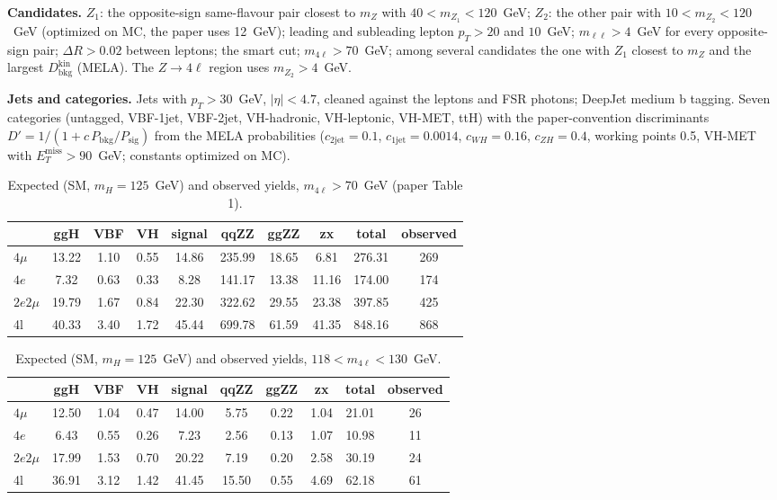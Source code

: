 \documentclass[11pt,a4paper]{article}
\begin{document}
\textbf{Candidates.} $Z_1$: the opposite-sign same-flavour pair closest to $m_Z$ with $40<m_{Z_1}<120$~GeV; $Z_2$:
the other pair with $10<m_{Z_2}<120$~GeV (optimized on MC, the paper uses 12~GeV); leading and subleading lepton
$p_T>20$ and $10$~GeV; $m_{\ell\ell}>4$~GeV for every opposite-sign pair; $\Delta R>0.02$ between leptons; the smart
cut; $m_{4\ell}>70$~GeV; among several candidates the one with $Z_1$ closest to $m_Z$ and the largest
$D_{\text{bkg}}^{\text{kin}}$ (MELA).  The $Z\to4\ell$ region uses $m_{Z_2}>4$~GeV.

\textbf{Jets and categories.} Jets with $p_T>30$~GeV, $|\eta|<4.7$, cleaned against the leptons and FSR photons;
DeepJet medium b tagging.  Seven categories (untagged, VBF-1jet, VBF-2jet, VH-hadronic, VH-leptonic, VH-MET, ttH) with
the paper-convention discriminants $D'=1/(1+c\,P_{\text{bkg}}/P_{\text{sig}})$ from the MELA probabilities
($c_{2\text{jet}}=0.1$, $c_{1\text{jet}}=0.0014$, $c_{WH}=0.16$, $c_{ZH}=0.4$, working points 0.5, VH-MET with
$E_T^{\text{miss}}>90$~GeV; constants optimized on MC).
\begin{table}[H]\centering\small\caption{Expected (SM, $m_H=125$~GeV) and observed yields, $m_{4\ell}>70$~GeV (paper Table 1).}\begin{tabular}{lccccccccc}\toprule & ggH & VBF & VH & signal & qqZZ & ggZZ & zx & total & observed\\\midrule
$4\mu$ & 13.22 & 1.10 & 0.55 & 14.86 & 235.99 & 18.65 & 6.81 & 276.31 & 269\\
$4e$ & 7.32 & 0.63 & 0.33 & 8.28 & 141.17 & 13.38 & 11.16 & 174.00 & 174\\
$2e2\mu$ & 19.79 & 1.67 & 0.84 & 22.30 & 322.62 & 29.55 & 23.38 & 397.85 & 425\\
4l & 40.33 & 3.40 & 1.72 & 45.44 & 699.78 & 61.59 & 41.35 & 848.16 & 868\\
\bottomrule\end{tabular}\end{table}
\begin{table}[H]\centering\small\caption{Expected (SM, $m_H=125$~GeV) and observed yields, $118<m_{4\ell}<130$~GeV.}\begin{tabular}{lccccccccc}\toprule & ggH & VBF & VH & signal & qqZZ & ggZZ & zx & total & observed\\\midrule
$4\mu$ & 12.50 & 1.04 & 0.47 & 14.00 & 5.75 & 0.22 & 1.04 & 21.01 & 26\\
$4e$ & 6.43 & 0.55 & 0.26 & 7.23 & 2.56 & 0.13 & 1.07 & 10.98 & 11\\
$2e2\mu$ & 17.99 & 1.53 & 0.70 & 20.22 & 7.19 & 0.20 & 2.58 & 30.19 & 24\\
4l & 36.91 & 3.12 & 1.42 & 41.45 & 15.50 & 0.55 & 4.69 & 62.18 & 61\\
\bottomrule\end{tabular}\end{table}
\end{document}
